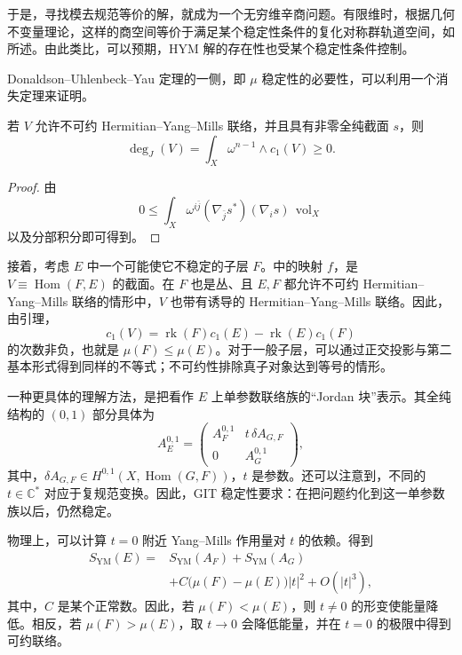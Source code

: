 于是，寻找模去规范等价的解，就成为一个无穷维辛商问题。有限维时，根据几何不变量理论，这样的商空间等价于满足某个稳定性条件的复化对称群轨道空间，如所述。由此类比，可以预期，HYM 解的存在性也受某个稳定性条件控制。

Donaldson--Uhlenbeck--Yau 定理的一侧，即 $\mu$ 稳定性的必要性，可以利用一个消失定理来证明。
\begin{lemma}\label{lem:5.9}
若 $V$ 允许不可约 Hermitian--Yang--Mills 联络，并且具有非零全纯截面 $s$，则
\[
\deg_J(V)=\int_X\omega^{n-1}\wedge c_1(V)\ge0.
\]
\end{lemma}
\begin{proof}
由
\[
0\le\int_X\omega^{i\bar j}(\nabla_{\bar j}s^*)(\nabla_i s)\,\operatorname{vol}_X
\]
以及分部积分即可得到。
\end{proof}

接着，考虑 $E$ 中一个可能使它不稳定的子层 $F$。中的映射 $f$，是 $V\equiv\operatorname{Hom}(F,E)$ 的截面。在 $F$ 也是丛、且 $E,F$ 都允许不可约 Hermitian--Yang--Mills 联络的情形中，$V$ 也带有诱导的 Hermitian--Yang--Mills 联络。因此，由引理，
\[
c_1(V)=\operatorname{rk}(F)c_1(E)-\operatorname{rk}(E)c_1(F)
\]
的次数非负，也就是 $\mu(F)\le\mu(E)$。对于一般子层，可以通过正交投影与第二基本形式得到同样的不等式；不可约性排除真子对象达到等号的情形。

一种更具体的理解方法，是把看作 $E$ 上单参数联络族的“Jordan 块”表示。其全纯结构的 $(0,1)$ 部分具体为
\[
A_E^{0,1}=\begin{pmatrix}
A_F^{0,1}&t\,\delta A_{G,F}\\
0&A_G^{0,1}
\end{pmatrix},
\]
其中，$\delta A_{G,F}\in H^{0,1}(X,\operatorname{Hom}(G,F))$，$t$ 是参数。还可以注意到，不同的 $t\in\mathbb{C}^*$ 对应于复规范变换。因此，GIT 稳定性要求：在把问题约化到这一单参数族以后，仍然稳定。

物理上，可以计算 $t=0$ 附近 Yang--Mills 作用量对 $t$ 的依赖。得到
\[
\begin{aligned}
S_{\mathrm{YM}}(E)={}&S_{\mathrm{YM}}(A_F)+S_{\mathrm{YM}}(A_G)\\
&+C\bigl(\mu(F)-\mu(E)\bigr)|t|^2+O(|t|^3),
\end{aligned}
\]
其中，$C$ 是某个正常数。因此，若 $\mu(F)<\mu(E)$，则 $t\ne0$ 的形变使能量降低。相反，若 $\mu(F)>\mu(E)$，取 $t\to0$ 会降低能量，并在 $t=0$ 的极限中得到可约联络。

